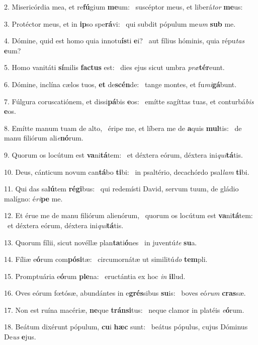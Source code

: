 2. Misericórdia mea, et re\textbf{fú}gium \textbf{me}um: \ast\  suscéptor meus, et liberá\textit{tor} \textbf{me}us:\

3. Protéctor meus, et in \textbf{ip}so spe\textbf{rá}vi: \ast\  qui subdit pópulum me\textit{um} \textbf{sub} me.\

4. Dómine, quid est homo quia innotu\textbf{ís}ti \textbf{e}i? \ast\  aut fílius hóminis, quia répu\textit{tas} \textbf{e}um?\

5. Homo vanitáti \textbf{sí}milis \textbf{fac}\textbf{tus} est: \ast\  dies ejus sicut umbra \textit{præ}\textbf{tér}eunt.\

6. Dómine, inclína cælos tuos, \textbf{et} de\textbf{scén}de: \ast\  tange montes, et fu\textit{mi}\textbf{gá}bunt.\

7. Fúlgura coruscatiónem, et dissi\textbf{pá}bis \textbf{e}os: \ast\  emítte sagíttas tuas, et conturbá\textit{bis} \textbf{e}os.\

8. Emítte manum tuam de alto, \dag\  éripe me, et líbera me de \textbf{a}quis \textbf{mul}tis: \ast\  de manu filiórum ali\textit{e}\textbf{nó}rum.\

9. Quorum os locútum est \textbf{va}ni\textbf{tá}tem: \ast\  et déxtera eórum, déxtera ini\textit{qui}\textbf{tá}tis.\

10. Deus, cánticum novum can\textbf{tá}bo \textbf{ti}bi: \ast\  in psaltério, decachórdo psal\textit{lam} \textbf{ti}bi.\

11. Qui das sa\textbf{lú}tem \textbf{ré}\textbf{gi}bus: \ast\  qui redemísti David, servum tuum, de gládio malígno: é\textit{ri}\textbf{pe} me.\

12. Et érue me de manu filiórum alienórum, \dag\  quorum os locútum est \textbf{va}ni\textbf{tá}tem: \ast\  et déxtera eórum, déxtera ini\textit{qui}\textbf{tá}tis.\

13. Quorum fílii, sicut novéllæ plan\textbf{ta}ti\textbf{ó}nes \ast\  in juventú\textit{te} \textbf{su}a.\

14. Fíliæ e\textbf{ó}rum com\textbf{pó}\textbf{si}tæ: \ast\  circumornátæ ut similitú\textit{do} \textbf{tem}pli.\

15. Promptuária e\textbf{ó}rum \textbf{ple}na: \ast\  eructántia ex hoc \textit{in} \textbf{il}lud.\

16. Oves eórum fœtósæ, abundántes in e\textbf{grés}sibus \textbf{su}is: \ast\  boves eó\textit{rum} \textbf{cras}sæ.\

17. Non est ruína macériæ, \textbf{ne}que \textbf{tráns}\textbf{i}tus: \ast\  neque clamor in platéis \textit{e}\textbf{ó}rum.\

18. Beátum dixérunt pópulum, \textbf{cu}i \textbf{hæc} sunt: \ast\  beátus pópulus, cujus Dóminus De\textit{us} \textbf{e}jus.\

